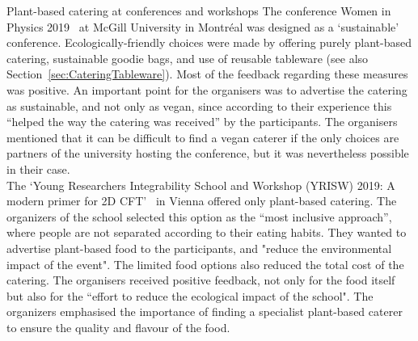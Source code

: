\documentclass[../SustainableHEP.tex]{subfiles}
\begin{document}
\begin{bestpractice}{Plant-based catering at conferences and workshops}%
\noindent The conference Women in Physics 2019~\cite{WIPC} at McGill University in Montréal was designed as a `sustainable' conference. Ecologically-friendly choices were made by offering purely plant-based catering, sustainable goodie bags, and use of reusable tableware (see also Section~\ref{sec:CateringTableware}). Most of the feedback regarding these measures was positive. An important point for the organisers was to advertise the catering as sustainable, and not only as vegan, since according to their experience this ``helped the way the catering was received'' by the participants. The organisers mentioned that it can be difficult to find a vegan caterer if the only choices are partners of the university hosting the conference, but it was nevertheless possible in their case.\\

   The `Young Researchers Integrability School and Workshop (YRISW) 2019: A modern primer for 2D CFT'~\cite{YRISW} in Vienna offered only plant-based catering. The organizers of the school selected this option as the ``most inclusive approach'', where people are not separated according to their eating habits. They wanted to advertise plant-based food to the participants, and "reduce the environmental impact of the event". The limited food options also reduced the total cost of the catering. The organisers received positive feedback, not only for the food itself but also for the ``effort to reduce the ecological impact of the school". The organizers emphasised the importance of finding a specialist plant-based caterer to ensure the quality and flavour of the food.
\end{bestpractice}
\end{document}
